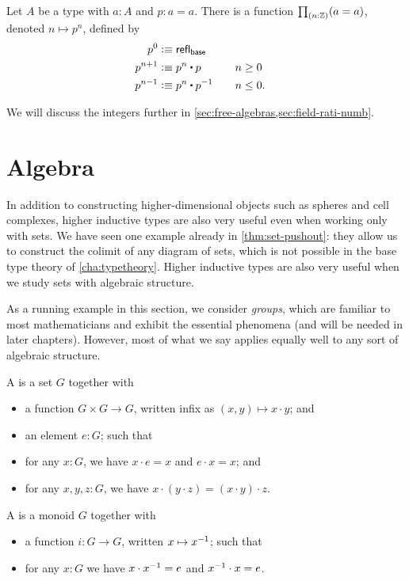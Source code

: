 \begin{cor}\label{thm:looptothe}
  Let $A$ be a type with $a:A$ and $p:a=a$.
  There is a function $\prd{n:\Z} (a=a)$, denoted $n\mapsto p^n$, defined by
  \begin{alignat*}{2}
    p^0 &\defeq \refl{\base}\\
    p^{n+1} &\defeq p^n \ct p
    &&\quad n\ge 0\\
    p^{n-1} &\defeq p^n \ct \opp p
    &&\quad n\le 0.
  \end{alignat*}
\end{cor}

We will discuss the integers further in \autoref{sec:free-algebras,sec:field-rati-numb}.


\section{Algebra}
\label{sec:free-algebras}

In addition to constructing higher-dimensional objects such as spheres and cell complexes, higher inductive types are also very useful even when working only with sets.
We have seen one example already in \autoref{thm:set-pushout}: they allow us to construct the colimit of any diagram of sets, which is not possible in the base type theory of \autoref{cha:typetheory}.
Higher inductive types are also very useful when we study sets with algebraic structure.

As a running example in this section, we consider \emph{groups}, which are familiar to most mathematicians and exhibit the essential phenomena (and will be needed in later chapters).
However, most of what we say applies equally well to any sort of algebraic structure.

\begin{defn}
  A  is a set $G$ together with
  \begin{itemize}
  \item a function $G\times G\to G$, written infix as $(x,y) \mapsto x\cdot y$; and
  \item an element $e:G$; such that
  \item for any $x:G$, we have $x\cdot e = x$ and $e\cdot x = x$; and
  \item for any $x,y,z:G$, we have $x\cdot (y\cdot z) = (x\cdot y)\cdot z$.
  \end{itemize}
  A  is a monoid $G$ together with
  \begin{itemize}
  \item a function $i:G\to G$, written $x\mapsto \mathord{{x}^{-1}}$; such that
  \item for any $x:G$ we have $x\cdot \mathord{{x}^{-1}} = e$ and $\mathord{{x}^{-1}} \cdot x = e$.
  \end{itemize}
\end{defn}


